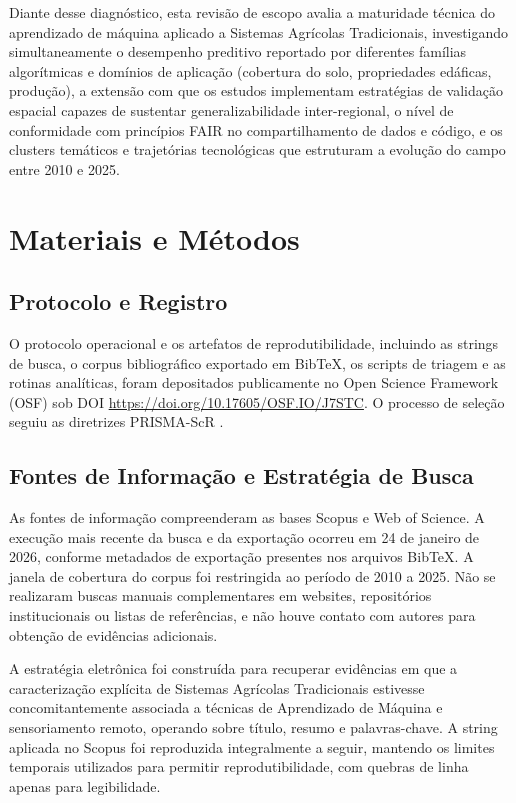 \documentclass[lineno,pdflatex,sn-apa]{sn-jnl}%
\begin{document}
Diante desse diagnóstico, esta revisão de escopo avalia a maturidade técnica do aprendizado de máquina aplicado a Sistemas Agrícolas Tradicionais, investigando simultaneamente o desempenho preditivo reportado por diferentes famílias algorítmicas e domínios de aplicação (cobertura do solo, propriedades edáficas, produção), a extensão com que os estudos implementam estratégias de validação espacial capazes de sustentar generalizabilidade inter-regional, o nível de conformidade com princípios FAIR no compartilhamento de dados e código, e os clusters temáticos e trajetórias tecnológicas que estruturam a evolução do campo entre 2010 e 2025.

\section[Materiais e Métodos]{Materiais e Métodos}

\subsection[Protocolo e Registro]{Protocolo e Registro}

O protocolo operacional e os artefatos de reprodutibilidade, incluindo as strings de busca, o corpus bibliográfico exportado em BibTeX, os scripts de triagem e as rotinas analíticas, foram depositados publicamente no Open Science Framework (OSF) sob DOI \url{https://doi.org/10.17605/OSF.IO/J7STC}. O processo de seleção seguiu as diretrizes PRISMA-ScR \citep{Tricco2018b}.

\subsection[Fontes de Informação e Estratégia de Busca]{Fontes de Informação e Estratégia de Busca}

As fontes de informação compreenderam as bases Scopus e Web of Science. A execução mais recente da busca e da exportação ocorreu em 24 de janeiro de 2026, conforme metadados de exportação presentes nos arquivos BibTeX. A janela de cobertura do corpus foi restringida ao período de 2010 a 2025. Não se realizaram buscas manuais complementares em websites, repositórios institucionais ou listas de referências, e não houve contato com autores para obtenção de evidências adicionais.

A estratégia eletrônica foi construída para recuperar evidências em que a caracterização explícita de Sistemas Agrícolas Tradicionais estivesse concomitantemente associada a técnicas de Aprendizado de Máquina e sensoriamento remoto, operando sobre título, resumo e palavras-chave. A string aplicada no Scopus foi reproduzida integralmente a seguir, mantendo os limites temporais utilizados para permitir reprodutibilidade, com quebras de linha apenas para legibilidade.
\end{document}
